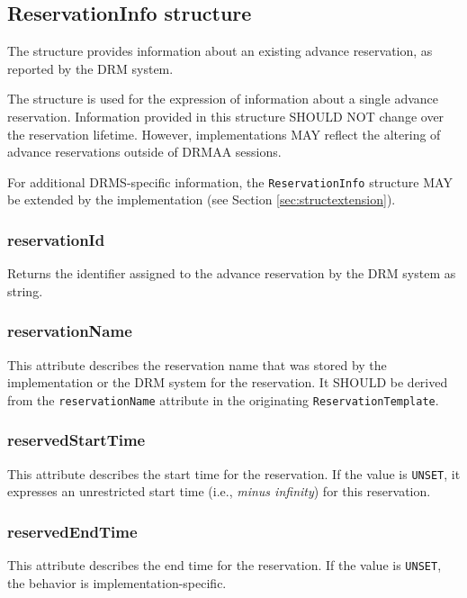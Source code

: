 \documentclass{article}
\newcommand{\h}[1]{\lstinline|#1|}
\begin{document}
\subsection{ReservationInfo structure}
\label{sec:reservationinfo}

The structure provides information about an existing advance reservation, as reported by the DRM system.



The structure is used for the expression of information about a single advance reservation. Information provided in this structure SHOULD NOT change over the reservation lifetime. However, implementations MAY reflect the altering of advance reservations outside of DRMAA sessions.

For additional DRMS-specific information, the \h{ReservationInfo} structure MAY be extended by the implementation (see Section \ref{sec:structextension}).

\subsubsection{reservationId}

Returns the identifier assigned to the advance reservation by the DRM system as string.

\subsubsection{reservationName}

This attribute describes the reservation name that was stored by the implementation or the DRM system for the reservation. It SHOULD be derived from the \h{reservationName} attribute in the originating \h{ReservationTemplate}. 

\subsubsection{reservedStartTime}

This attribute describes the start time for the reservation. If the value is \h{UNSET}, it expresses an unrestricted start time (i.e., \emph{minus infinity}) for this reservation.

\subsubsection{reservedEndTime}

This attribute describes the end time for the reservation. If the value is \h{UNSET}, the behavior is implementation-specific.
\end{document}
